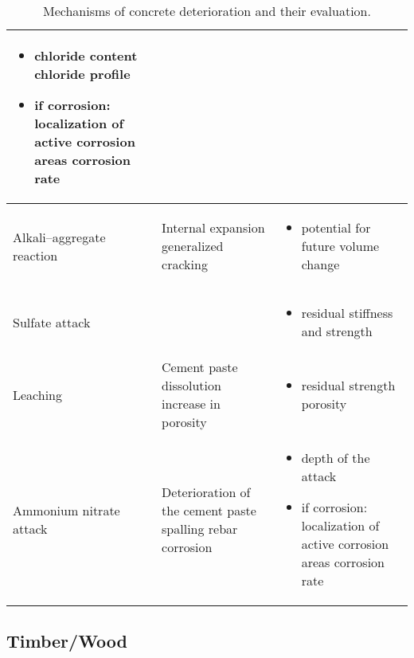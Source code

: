 \begin{table}[h!]
\begin{tabularx}{\textwidth}{|X|X|X|}
\begin{itemize}[leftmargin=*, nosep, after=\strut]
    \item chloride content chloride profile
    \item if corrosion: localization of active corrosion areas corrosion rate
\end{itemize} \\
\hline
Alkali–aggregate reaction & Internal expansion generalized cracking & 
\begin{itemize}[leftmargin=*, nosep, after=\strut]
    \item potential for future volume change
\end{itemize} \\
\hline
Sulfate attack & & 
\begin{itemize}[leftmargin=*, nosep, after=\strut]
    \item residual stiffness and strength
\end{itemize} \\
\hline
Leaching & Cement paste dissolution increase in porosity & 
\begin{itemize}[leftmargin=*, nosep, after=\strut]
    \item residual strength porosity
\end{itemize} \\
\hline
Ammonium nitrate attack & Deterioration of the cement paste spalling rebar corrosion & 
\begin{itemize}[leftmargin=*, nosep, after=\strut]
    \item depth of the attack
    \item if corrosion: localization of active corrosion areas corrosion rate
\end{itemize} \\
\hline
\end{tabularx}
\caption{Mechanisms of concrete deterioration and their evaluation.}
\label{tab:mechanisms}
\end{table}

\subsection{Timber/Wood}




